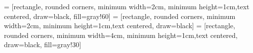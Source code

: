 \documentclass[gmd, manuscript]{copernicus}
\begin{document}





\clearpage
{} = [rectangle, rounded corners, minimum width=2cm, minimum height=1cm,text centered, draw=black, fill=gray!60]
 = [rectangle, rounded corners, minimum width=2cm, minimum height=1cm,text centered, draw=black]
 = [rectangle, rounded corners, minimum width=4cm, minimum height=1cm,text centered, draw=black, fill=gray!30]
\end{document}
